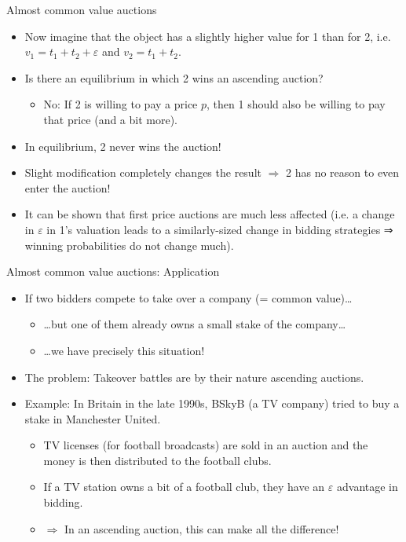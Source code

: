 \documentclass[bigger]{beamer}
\newcommand{\Ra}{\Rightarrow} \newcommand{\ra}{\rightarrow} \newcommand{\Lra}{\Leftrightarrow}
\begin{document}
\begin{frame}[label={sec:org19b344f}]{Almost common value auctions}
\begin{itemize}
\item Now imagine that the object has a slightly higher value for 1 than for 2, i.e. \(v_ 1 = t_ 1 + t_ 2 + \varepsilon\) and \(v_ 2 = t_ 1 + t_ 2\).
\item Is there an equilibrium in which 2 wins an ascending auction?
\begin{itemize}
\item No: If 2 is willing to pay a price \(p\), then 1 should also be willing to pay that price (and a bit more).
\end{itemize}
\item In equilibrium, 2 never wins the auction!
\item Slight modiﬁcation completely changes the result \(\Ra\) 2 has no reason to even enter the auction!
\item It can be shown that first price auctions are much less affected (i.e. a change in \(\varepsilon\) in 1’s valuation leads to a similarly-sized change in bidding strategies ⇒ winning probabilities do not change much).
\end{itemize}
\end{frame}

\begin{frame}[label={sec:orge283db5}]{Almost common value auctions: Application}
\begin{itemize}
\item If two bidders compete to take over a company (= common value)\ldots{}
\begin{itemize}
\item \ldots{}but one of them already owns a small stake of the company\ldots{}
\item \ldots{}we have precisely this situation!
\end{itemize}
\item The problem: Takeover battles are by their nature ascending auctions.
\item Example: In Britain in the late 1990s, BSkyB (a TV company) tried to buy a stake in Manchester United.
\begin{itemize}
\item TV licenses (for football broadcasts) are sold in an auction and the money is then distributed to the football clubs.
\item If a TV station owns a bit of a football club, they have an \(\varepsilon\) advantage in bidding.
\item \(\Ra\) In an ascending auction, this can make all the difference!
\end{itemize}
\end{itemize}
\end{frame}
\end{document}
